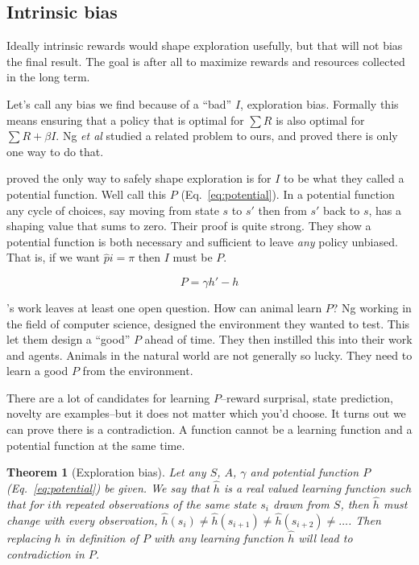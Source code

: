 \documentclass[9pt,lineno]{elife}
\newtheorem{theorem}{Theorem}
\begin{document}
\subsection*{Intrinsic bias}
Ideally intrinsic rewards would shape exploration usefully, but that will not bias the final result. The goal is after all to maximize rewards and resources collected in the long term. 

Let's call any bias we find because of a ``bad'' $I$, exploration bias. Formally this means ensuring that a policy that is optimal for $\sum R$ is also optimal for $\sum R + \beta I$. Ng \textit{et al} \cite{Ng1999} studied a related problem to ours, and proved there is only one way to do that.

\cite{Ng1999} proved the only way to safely shape exploration is for $I$ to be what they called a potential function. Well call this $P$ (Eq.~\ref{eq:potential}). In a potential function any cycle of choices, say moving from state $s$ to $s'$ then from $s'$ back to $s$, has a shaping value that sums to zero. Their proof is quite strong. They show a potential function is both necessary and sufficient to leave \textit{any} policy unbiased. That is, if we want $\hat pi = \pi$ then $I$ must be $P$.

\begin{equation}
    \label{eq:potential}
    P = \gamma h' - h
\end{equation}

\cite{Ng1999}'s work leaves at least one open question. How can animal learn $P$? Ng working in the field of computer science, designed the environment they wanted to test. This let them design a ``good'' $P$ ahead of time. They then instilled this into their work and agents. Animals in the natural world are not generally so lucky. They need to learn a good $P$ from the environment.

There are a lot of candidates for learning $P$--reward surprisal, state prediction, novelty are examples--but it does not matter which you'd choose. It turns out we can prove there is a contradiction. A function cannot be a learning function and a potential function at the same time.

\begin{theorem}[Exploration bias]
\label{th:potential}
Let any $S$, $A$, $\gamma$ and potential function $P$ (Eq.~\ref{eq:potential}) be given. We say that $\hat h$ is a real valued learning function such that for $i$th repeated observations of the same state $s_i$ drawn from $S$, then $\hat h$ must change with every observation, $\hat h(s_i) \neq \hat h(s_{i+1}) \neq \hat h(s_{i+2}) \neq \ldots$. Then replacing $h$ in definition of $P$ with \textit{any} learning function $\hat h$ will lead to contradiction in $P$.
\end{theorem}
\end{document}
